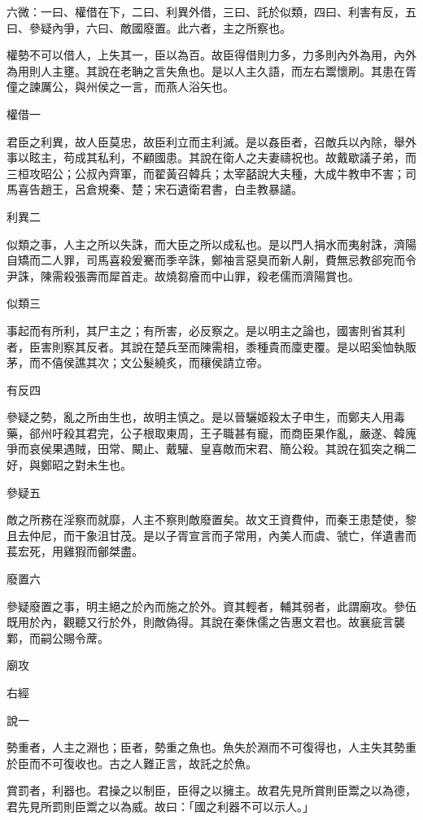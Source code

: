 
\begin{pinyinscope}
六微：一曰、權借在下，二曰、利異外借，三曰、託於似類，四曰、利害有反，五曰、參疑內爭，六曰、敵國廢置。此六者，主之所察也。

權勢不可以借人，上失其一，臣以為百。故臣得借則力多，力多則內外為用，內外為用則人主壅。其說在老聃之言失魚也。是以人主久語，而左右鬻懷刷。其患在胥僮之諫厲公，與州侯之一言，而燕人浴矢也。

權借一

君臣之利異，故人臣莫忠，故臣利立而主利滅。是以姦臣者，召敵兵以內除，舉外事以眩主，苟成其私利，不顧國患。其說在衛人之夫妻禱祝也。故戴歇議子弟，而三桓攻昭公；公叔內齊軍，而翟黃召韓兵；太宰嚭說大夫種，大成牛教申不害；司馬喜告趙王，呂倉規秦、楚；宋石遺衛君書，白圭教暴譴。

利異二

似類之事，人主之所以失誅，而大臣之所以成私也。是以門人捐水而夷射誅，濟陽自矯而二人罪，司馬喜殺爰騫而季辛誅，鄭袖言惡臭而新人劓，費無忌教郤宛而令尹誅，陳需殺張壽而犀首走。故燒芻廥而中山罪，殺老儒而濟陽賞也。

似類三

事起而有所利，其尸主之；有所害，必反察之。是以明主之論也，國害則省其利者，臣害則察其反者。其說在楚兵至而陳需相，黍種貴而廩吏覆。是以昭奚恤執販茅，而不僖侯譙其次；文公髮繞炙，而穰侯請立帝。

有反四

參疑之勢，亂之所由生也，故明主慎之。是以晉驪姬殺太子申生，而鄭夫人用毒藥，郤州吁殺其君完，公子根取東周，王子職甚有寵，而商臣果作亂，嚴遂、韓廆爭而哀侯果遇賊，田常、闞止、戴驩、皇喜敵而宋君、簡公殺。其說在狐突之稱二好，與鄭昭之對未生也。

參疑五

敵之所務在淫察而就靡，人主不察則敵廢置矣。故文王資費仲，而秦王患楚使，黎且去仲尼，而干象沮甘茂。是以子胥宣言而子常用，內美人而虞、虢亡，佯遺書而萇宏死，用雞猳而鄶桀盡。

廢置六

參疑廢置之事，明主絕之於內而施之於外。資其輕者，輔其弱者，此謂廟攻。參伍既用於內，觀聽又行於外，則敵偽得。其說在秦侏儒之告惠文君也。故襄疵言襲鄴，而嗣公賜令蓆。

廟攻

右經

說一

勢重者，人主之淵也；臣者，勢重之魚也。魚失於淵而不可復得也，人主失其勢重於臣而不可復收也。古之人難正言，故託之於魚。

賞罰者，利器也。君操之以制臣，臣得之以擁主。故君先見所賞則臣鬻之以為德，君先見所罰則臣鬻之以為威。故曰：「國之利器不可以示人。」


\end{pinyinscope}

